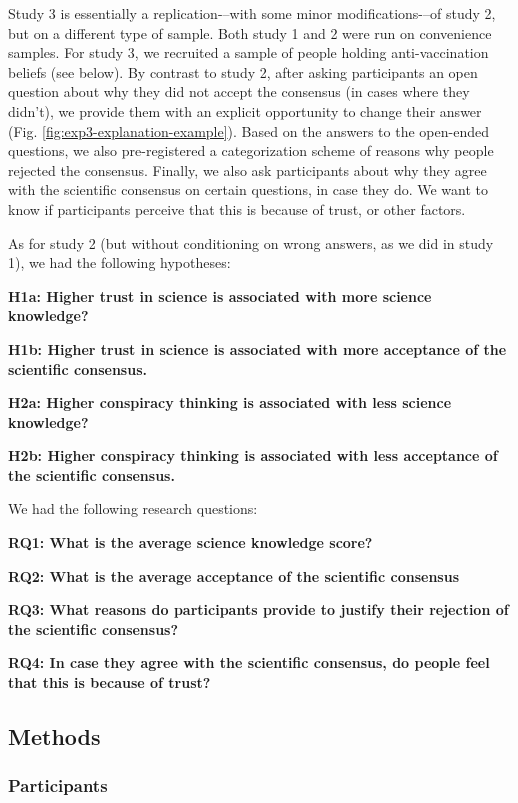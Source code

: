 \documentclass[
  doc,floatsintext]{apa6}
\begin{document}
Study 3 is essentially a replication-\/--with some minor modifications-\/--of study 2, but on a different type of sample. Both study 1 and 2 were run on convenience samples. For study 3, we recruited a sample of people holding anti-vaccination beliefs (see below). By contrast to study 2, after asking participants an open question about why they did not accept the consensus (in cases where they didn't), we provide them with an explicit opportunity to change their answer (Fig. \ref{fig:exp3-explanation-example}). Based on the answers to the open-ended questions, we also pre-registered a categorization scheme of reasons why people rejected the consensus. Finally, we also ask participants about why they agree with the scientific consensus on certain questions, in case they do. We want to know if participants perceive that this is because of trust, or other factors.

As for study 2 (but without conditioning on wrong answers, as we did in study 1), we had the following hypotheses:

\textbf{H1a: Higher trust in science is associated with more science knowledge?}

\textbf{H1b: Higher trust in science is associated with more acceptance of the scientific consensus.}

\textbf{H2a: Higher conspiracy thinking is associated with less science knowledge?}

\textbf{H2b: Higher conspiracy thinking is associated with less acceptance of the scientific consensus.}

We had the following research questions:

\textbf{RQ1: What is the average science knowledge score?}

\textbf{RQ2: What is the average acceptance of the scientific consensus}

\textbf{RQ3: What reasons do participants provide to justify their rejection of the scientific consensus?}

\textbf{RQ4: In case they agree with the scientific consensus, do people feel that this is because of trust?}

\subsection{Methods}\label{methods-2}

\subsubsection{Participants}\label{participants-2}
\end{document}
